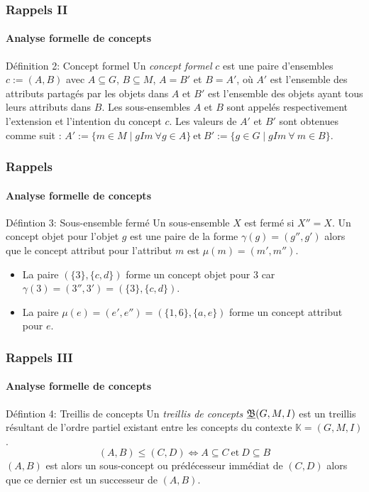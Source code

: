 \documentclass[french]{beamer}
\def\KK{\mathbb{K}}
\begin{document}
\begin{frame}
\frametitle{Rappels II}
\framesubtitle{Analyse formelle de concepts}
\begin{block}{Définition 2: Concept formel}
Un \emph{concept formel} $c$ est une paire d'ensembles $c:= (A,B)$ avec $A \subseteq G$, $B \subseteq M$, $A=B'$ et $B=A'$, où $A'$ est l'ensemble des attributs partagés par les objets dans $A$ et $B'$ est l'ensemble des objets ayant tous leurs attributs dans $B$. Les sous-ensembles $A$ et $B$ sont appelés respectivement l'extension et l'intention du concept $c$. Les valeurs de $A'$ et $B'$ sont obtenues comme suit : 
$A':=\{m \in M \mid g I m\ \forall g \in A\}\ \text{et}\ B':=\{g \in G \mid g I m\ \forall~m \in B\}$.
\end{block}
\end{frame}


\begin{frame}
\frametitle{Rappels}
\framesubtitle{Analyse formelle de concepts}
\begin{block}{Défintion 3: Sous-ensemble fermé}
Un sous-ensemble $X$ est fermé si $X''=X$. Un concept objet pour l'objet $g$ est une paire de la forme $\gamma(g)=(g'', g')$ alors que le concept attribut pour l'attribut $m$ est $\mu(m)=(m', m'')$.
\end{block}
\begin{itemize}
  \item La paire $(\{3\}, \{c, d\})$ forme un concept objet pour $3$ car  $\gamma(3)=(3'', 3')= (\{3\}, \{c, d\})$.
  \item La paire $\mu(e)=(e', e'')=(\{1, 6\}, \{a, e\})$ forme un concept attribut pour $e$.
\end{itemize}
\end{frame}
\begin{frame}
\frametitle{Rappels III}
\framesubtitle{Analyse formelle de concepts}
\begin{block}{Défintion 4: Treillis de concepts}
Un \textit{treillis de concepts} $\underline{{\mathfrak B}} (G,M,\mathrel{I})$ est un treillis résultant de l'ordre partiel existant entre les concepts du contexte $\KK = (G,M,I)$.
$$(A,B) \leq (C,D) \Leftrightarrow A \subseteq C\ \text{et}\ D \subseteq B$$
$(A, B)$ est alors un sous-concept ou prédécesseur immédiat de $(C, D)$ alors que ce dernier est un successeur de $(A, B)$.
\end{block}
\end{frame}
\end{document}
